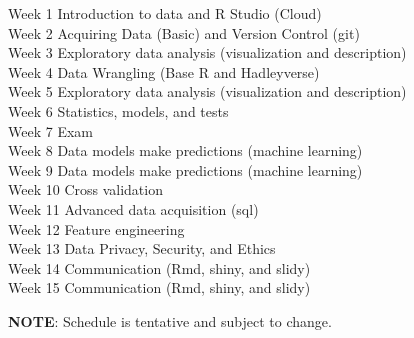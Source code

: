  
\begin{flushleft}
Week 1 	\dotfill     Introduction to data and R Studio (Cloud) \\
Week 2 	\dotfill     Acquiring Data (Basic)  and Version Control (git)   \\ 
Week 3 	\dotfill     Exploratory data analysis (visualization and description) \\
Week 4 	\dotfill     Data Wrangling (Base R and Hadleyverse)    \\
Week 5 	\dotfill     Exploratory data analysis (visualization and description) \\
Week 6 	\dotfill     Statistics, models, and tests      \\
Week 7  \dotfill     Exam     \\
Week 8 	\dotfill     Data models make predictions (machine learning)    \\
Week 9  \dotfill     Data models make predictions (machine learning)  \\
Week 10 \dotfill     Cross validation \\
Week 11 \dotfill     Advanced data acquisition (sql)   \\
Week 12 \dotfill     Feature engineering  \\
Week 13 \dotfill     Data Privacy, Security, and Ethics    \\
Week 14 \dotfill     Communication (Rmd, shiny, and slidy)  \\
Week 15 \dotfill     Communication (Rmd, shiny, and slidy) \\  
\end{flushleft}

\textbf{NOTE}: Schedule is tentative and subject to change.
